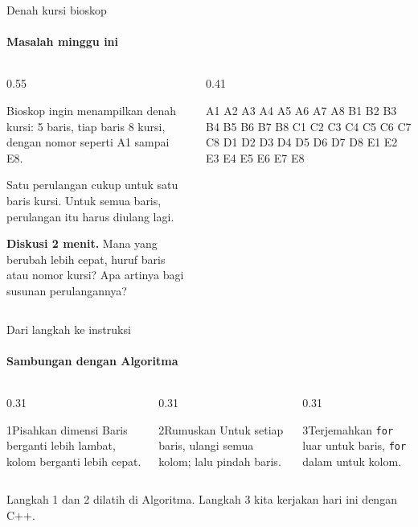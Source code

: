 \documentclass[t]{beamer}
\begin{document}

\begin{frame}[fragile]{Denah kursi bioskop}
\framesubtitle{Masalah minggu ini}
\begin{columns}[T]
\begin{column}{0.55\textwidth}
{Bioskop ingin menampilkan denah kursi: 5 baris, tiap baris 8 kursi, dengan nomor seperti A1 sampai E8.

\vspace{6pt}
Satu perulangan cukup untuk satu baris kursi. Untuk semua baris, perulangan itu harus diulang lagi.\par}
\vspace{6pt}
\begin{Catatan}
\textbf{Diskusi 2 menit.} Mana yang berubah lebih cepat, huruf baris atau nomor kursi? Apa artinya bagi susunan perulangannya?
\end{Catatan}
\end{column}
\begin{column}{0.41\textwidth}
\begin{Keluaran}[]
A1 A2 A3 A4 A5 A6 A7 A8
B1 B2 B3 B4 B5 B6 B7 B8
C1 C2 C3 C4 C5 C6 C7 C8
D1 D2 D3 D4 D5 D6 D7 D8
E1 E2 E3 E4 E5 E6 E7 E8
\end{Keluaran}
\end{column}
\end{columns}
\end{frame}

\begin{frame}{Dari langkah ke instruksi}
\framesubtitle{Sambungan dengan Algoritma}
\begin{columns}[T]
\begin{column}{0.31\textwidth}
\begin{Langkah}{1}{Pisahkan dimensi}
Baris berganti lebih lambat, kolom berganti lebih cepat.
\end{Langkah}
\end{column}
\begin{column}{0.31\textwidth}
\begin{Langkah}{2}{Rumuskan}
Untuk setiap baris, ulangi semua kolom; lalu pindah baris.
\end{Langkah}
\end{column}
\begin{column}{0.31\textwidth}
\begin{Langkah}{3}{Terjemahkan}
\texttt{for} luar untuk baris, \texttt{for} dalam untuk kolom.
\end{Langkah}
\end{column}
\end{columns}
\vspace{10pt}
Langkah 1 dan 2 dilatih di Algoritma. Langkah 3 kita kerjakan hari ini dengan C++.
\end{frame}
\end{document}
